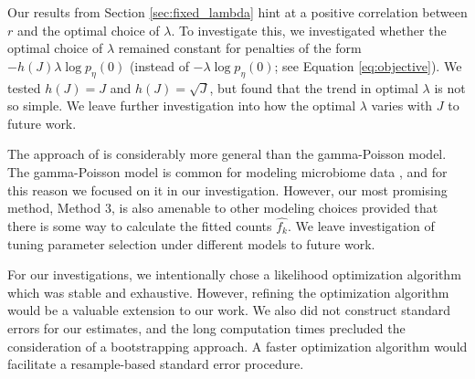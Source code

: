 \documentclass[12pt]{article}
\newcommand{\lambdagrid}{\lambda^{\text{grid}}}
\theoremstyle{break}
\theoremstyle{break}
\begin{document}
Our results from Section \ref{sec:fixed_lambda} hint at a positive correlation between $r$ and the optimal choice of $\lambda$. To investigate this, we investigated whether the optimal choice of $\lambda$ remained constant for penalties of the form $-h(J)\lambda \log p_{\eta}(0)$ (instead of $-\lambda \log p_{\eta}(0)$; see Equation \eqref{eq:objective}).
We tested $h(J) = J$ and $h(J) = \sqrt{J}$, but found that the trend in optimal $\lambda$ is not so simple. We leave further investigation into how the optimal $\lambda$ varies with $J$ to future work.

The approach of \citet{wang_2005} is considerably more general than the gamma-Poisson model.  The gamma-Poisson model is common for modeling microbiome data \citep{deseq2,mcmurdie2013phyloseq}, and for this reason we focused on it in our investigation. However, our most promising method, Method 3, is also amenable to other modeling choices provided that there is some way to calculate the fitted counts $\widehat{f_k}$. We leave investigation of tuning parameter selection under different models to future work.

For our investigations, we intentionally chose a likelihood optimization algorithm which was stable and exhaustive. However, refining the optimization algorithm would be a valuable extension to our work. We also did not construct standard errors for our estimates, and the long computation times precluded the consideration of a bootstrapping approach.  A faster optimization algorithm would facilitate a resample-based standard error procedure.


\end{document}
